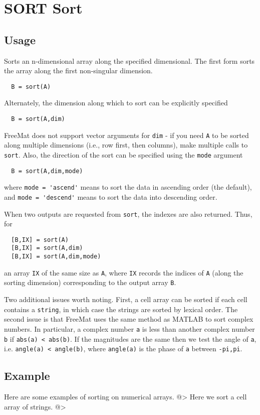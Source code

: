 \section{SORT Sort }

\subsection{Usage}

Sorts an n-dimensional array along the specified dimensional.  The first
form sorts the array along the first non-singular dimension.
\begin{verbatim}
  B = sort(A)
\end{verbatim}
Alternately, the dimension along which to sort can be explicitly specified
\begin{verbatim}
  B = sort(A,dim)
\end{verbatim}
FreeMat does not support vector arguments for \verb|dim| - if you need \verb|A| to be
sorted along multiple dimensions (i.e., row first, then columns), make multiple
calls to \verb|sort|.  Also, the direction of the sort can be specified using the 
\verb|mode| argument
\begin{verbatim}
  B = sort(A,dim,mode)
\end{verbatim}
where \verb|mode = 'ascend'| means to sort the data in ascending order (the default),
and \verb|mode = 'descend'| means to sort the data into descending order.  

When two outputs are requested from \verb|sort|, the indexes are also returned.
Thus, for 
\begin{verbatim}
  [B,IX] = sort(A)
  [B,IX] = sort(A,dim)
  [B,IX] = sort(A,dim,mode)
\end{verbatim}
an array \verb|IX| of the same size as \verb|A|, where \verb|IX| records the indices of \verb|A|
(along the sorting dimension) corresponding to the output array \verb|B|. 

Two additional issues worth noting.  First, a cell array can be sorted if each 
cell contains a \verb|string|, in which case the strings are sorted by lexical order.
The second issue is that FreeMat uses the same method as MATLAB to sort complex
numbers.  In particular, a complex number \verb|a| is less than another complex
number \verb|b| if \verb|abs(a) < abs(b)|.  If the magnitudes are the same then we 
test the angle of \verb|a|, i.e. \verb|angle(a) < angle(b)|, where \verb|angle(a)| is the
phase of \verb|a| between \verb|-pi,pi|.
\subsection{Example}

Here are some examples of sorting on numerical arrays.
@>
Here we sort a cell array of strings.
@>
